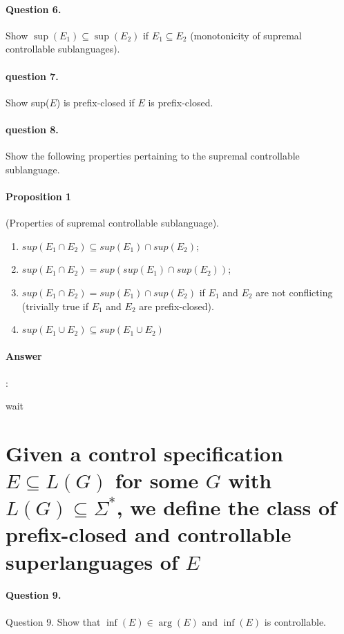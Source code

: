 \documentclass{article}
\begin{document}
\paragraph{Question 6.} Show $\sup \left(E_1\right) \subseteq \sup \left(E_2\right)$ if $E_1 \subseteq E_2$ (monotonicity of supremal controllable sublanguages).
\paragraph{question 7.} Show sup($E$) is prefix-closed if $E$ is prefix-closed.
\paragraph{question 8.} Show the following properties pertaining to the supremal controllable sublanguage.
\paragraph{Proposition 1} (Properties of supremal controllable sublanguage).
\begin{enumerate}
  \item $sup(E_1 \cap E_2) \subseteq sup(E_1) \cap sup(E_2)$;
  \item $sup(E_1 \cap E_2) = sup(sup(E_1) \cap sup(E_2))$;
  \item $sup(E_1 \cap E_2) = sup(E_1) \cap sup(E_2)$ if $E_1$ and $E_2$ are not conflicting (trivially true if $E_1$ and $E_2$ are prefix-closed).
  \item $sup(E_1 \cup E_2) \subseteq sup(E_1 \cup E_2)$
\end{enumerate}


\paragraph{Answer}:

wait


\section{Given a control specification $E \subseteq L(G)$ for some $G$ with $L(G) \subseteq \Sigma^*$, we define the class of prefix-closed and controllable superlanguages of $E$}

\paragraph{Question 9.} Question 9. Show that $\inf (E) \in \arg (E)$ and $\inf (E)$ is controllable.
\end{document}
